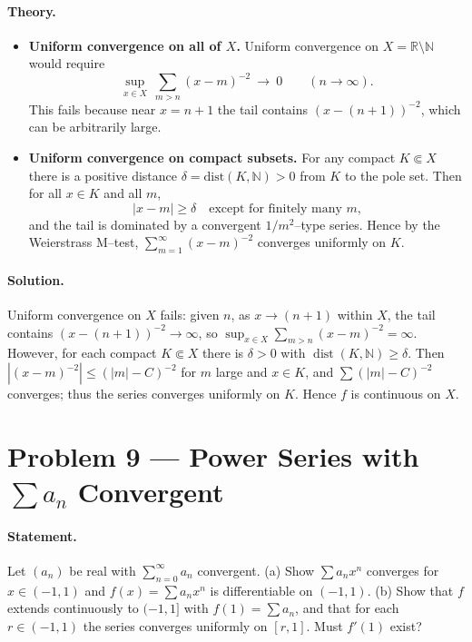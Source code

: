 \documentclass[12pt,a4paper]{article}
\theoremstyle{plain}
\theoremstyle{definition}
\theoremstyle{remark}
\theoremstyle{remark}
\begin{document}
\paragraph{Theory.}
\begin{itemize}
	\item \textbf{Uniform convergence on all of $X$.}
	Uniform convergence on $X=\mathbb{R}\setminus\mathbb{N}$ would require
	\[
	\sup_{x\in X}\ \sum_{m>n} (x-m)^{-2}\ \longrightarrow\ 0\qquad (n\to\infty).
	\]
	This fails because near $x=n+1$ the tail contains $(x-(n+1))^{-2}$, which can be arbitrarily large.
	
	\item \textbf{Uniform convergence on compact subsets.}
	For any compact $K\Subset X$ there is a positive distance $\delta=\mathrm{dist}(K,\mathbb{N})>0$
	from $K$ to the pole set. Then for all $x\in K$ and all $m$,
	\[
	|x-m|\ge\delta \quad\text{except for finitely many $m$,}
	\]
	and the tail is dominated by a convergent $1/m^{2}$–type series. Hence by the Weierstrass M–test,
	$\displaystyle \sum_{m=1}^\infty (x-m)^{-2}$ converges uniformly on $K$.
\end{itemize}


\paragraph{Solution.}
Uniform convergence on $X$ fails: given $n$, as $x\to(n+1)$ within $X$,
the tail contains $(x-(n+1))^{-2}\to\infty$, so $\sup_{x\in X}\sum_{m>n}(x-m)^{-2}=\infty$.
However, for each compact $K\Subset X$ there is $\delta>0$ with $\operatorname{dist}(K,\mathbb N)\ge\delta$.
Then $|(x-m)^{-2}|\le (|m|-C)^{-2}$ for $m$ large and $x\in K$, and $\sum (|m|-C)^{-2}$ converges; thus the series
converges uniformly on $K$. Hence $f$ is continuous on $X$.

\bigskip
\section*{Problem 9 — Power Series with $\sum a_n$ Convergent}

\paragraph{Statement.}
Let $(a_n)$ be real with $\sum_{n=0}^\infty a_n$ convergent.
(a) Show $\sum a_n x^n$ converges for $x\in(-1,1)$ and $f(x)=\sum a_n x^n$ is differentiable on $(-1,1)$.
(b) Show that $f$ extends continuously to $(-1,1]$ with $f(1)=\sum a_n$, and that for each $r\in(-1,1)$ the series
converges uniformly on $[r,1]$. Must $f'(1)$ exist?
\end{document}
